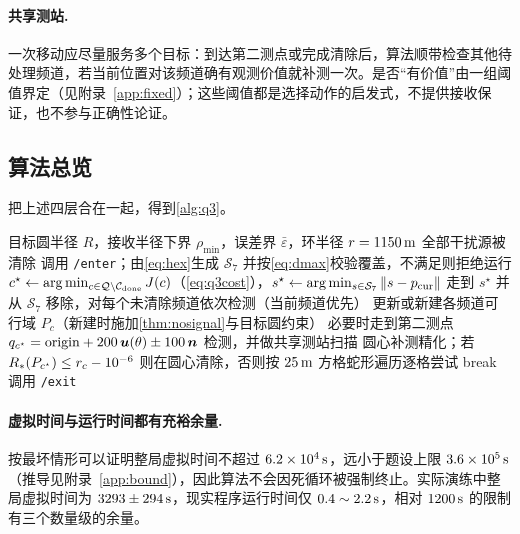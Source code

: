 \paragraph{共享测站.} 一次移动应尽量服务多个目标：到达第二测点或完成清除后，算法顺带检查其他待处理频道，若当前位置对该频道确有观测价值就补测一次。是否“有价值”由一组阈值界定（见附录~\ref{app:fixed}）；这些阈值都是选择动作的启发式，不提供接收保证，也不参与正确性论证。

\subsection{算法总览}

把上述四层合在一起，得到\cref{alg:q3}。

\begin{algorithm}[!htbp]
\caption{第三问：七站覆盖 $+$ 混合贪心的在线搜索、定位与清除}\label{alg:q3}
\begin{algorithmic}[1]
\Require 目标圆半径 $R$，接收半径下界 $\rho_{\min}$，误差界 $\bar\varepsilon$，环半径 $r=1150\,\mathrm{m}$
\Ensure 全部干扰源被清除
\State 调用 \texttt{/enter}；由\cref{eq:hex}生成 $\mathcal S_7$ 并按\cref{eq:dmax}校验覆盖，不满足则拒绝运行
  \State $c^\star\gets\arg\min_{c\in\mathcal Q\setminus\mathcal C_{\rm done}}J(c)$（\cref{eq:q3cost}），$s^\star\gets\arg\min_{s\in\mathcal S_7}\|s-p_{\rm cur}\|$
    \State 走到 $s^\star$ 并从 $\mathcal S_7$ 移除，对每个未清除频道依次检测（当前频道优先）
    \State 更新或新建各频道可行域 $P_c$（新建时施加\cref{thm:nosignal}与目标圆约束）
  \Else
    \State 必要时走到第二测点 $q_{c^\star}=\text{origin}+200\,\bm{u}(\theta)\pm100\,\bm n$ 检测，并做共享测站扫描
    \State 圆心补测精化；若 $R_{*}(P_{c^\star})\le r_c-10^{-6}$ 则在圆心清除，否则按 $25\,\mathrm{m}$ 方格蛇形遍历逐格尝试
  \EndIf
   break 
  \EndIf
\EndWhile
\State 调用 \texttt{/exit}
\end{algorithmic}
\end{algorithm}

\paragraph{虚拟时间与运行时间都有充裕余量.} 按最坏情形可以证明整局虚拟时间不超过 $6.2\times10^{4}\,\mathrm{s}$，远小于题设上限 $3.6\times10^{5}\,\mathrm{s}$（推导见附录~\ref{app:bound}），因此算法不会因死循环被强制终止。实际演练中整局虚拟时间为 $3293\pm294\,\mathrm{s}$，现实程序运行时间仅 $0.4\sim2.2\,\mathrm{s}$，相对 $1200\,\mathrm{s}$ 的限制有三个数量级的余量。

